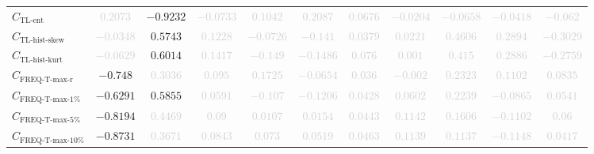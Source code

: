\documentclass{standalone}
\newcommand{\tlentropyname}{\text{TL-ent}}
\newcommand{\tlentropy}{C_{\tlentropyname}}
\newcommand{\tlskewhistname}{\text{TL-hist-skew}}
\newcommand{\tlskewhist}{C_{\tlskewhistname}}
\newcommand{\tlkurthistname}{\text{TL-hist-kurt}}
\newcommand{\tlkurthist}{C_{\tlkurthistname}}
\newcommand{\freqmaxrname}{\text{FREQ-T-max-r}}
\newcommand{\freqmaxr}{C_{\freqmaxrname}}
\newcommand{\freqmaxonename}{\text{FREQ-T-max-1\%}}
\newcommand{\freqmaxone}{C_{\freqmaxonename}}
\newcommand{\freqmaxfivename}{\text{FREQ-T-max-5\%}}
\newcommand{\freqmaxfive}{C_{\freqmaxfivename}}
\newcommand{\freqmaxtenname}{\text{FREQ-T-max-10\%}}
\newcommand{\freqmaxten}{C_{\freqmaxtenname}}
\begin{document}
\begin{tabular}{lcccccccccc}
$\tlentropy$ & \textcolor{lightgray}{$0.2073$} & $-0.9232$ & \textcolor{lightgray}{$-0.0733$} & \textcolor{lightgray}{$0.1042$} & \textcolor{lightgray}{$0.2087$} & \textcolor{lightgray}{$0.0676$} & \textcolor{lightgray}{$-0.0204$} & \textcolor{lightgray}{$-0.0658$} & \textcolor{lightgray}{$-0.0418$} & \textcolor{lightgray}{$-0.062$} \\ 
$\tlskewhist$ & \textcolor{lightgray}{$-0.0348$} & $0.5743$ & \textcolor{lightgray}{$0.1228$} & \textcolor{lightgray}{$-0.0726$} & \textcolor{lightgray}{$-0.141$} & \textcolor{lightgray}{$0.0379$} & \textcolor{lightgray}{$0.0221$} & \textcolor{lightgray}{$0.4606$} & \textcolor{lightgray}{$0.2894$} & \textcolor{lightgray}{$-0.3029$} \\ 
$\tlkurthist$ & \textcolor{lightgray}{$-0.0629$} & $0.6014$ & \textcolor{lightgray}{$0.1417$} & \textcolor{lightgray}{$-0.149$} & \textcolor{lightgray}{$-0.1486$} & \textcolor{lightgray}{$0.076$} & \textcolor{lightgray}{$0.001$} & \textcolor{lightgray}{$0.415$} & \textcolor{lightgray}{$0.2886$} & \textcolor{lightgray}{$-0.2759$} \\ 
$\freqmaxr$ & $-0.748$ & \textcolor{lightgray}{$0.3036$} & \textcolor{lightgray}{$0.095$} & \textcolor{lightgray}{$0.1725$} & \textcolor{lightgray}{$-0.0654$} & \textcolor{lightgray}{$0.036$} & \textcolor{lightgray}{$-0.002$} & \textcolor{lightgray}{$0.2323$} & \textcolor{lightgray}{$0.1102$} & \textcolor{lightgray}{$0.0835$} \\ 
$\freqmaxone$ & $-0.6291$ & $0.5855$ & \textcolor{lightgray}{$0.0591$} & \textcolor{lightgray}{$-0.107$} & \textcolor{lightgray}{$-0.1206$} & \textcolor{lightgray}{$0.0428$} & \textcolor{lightgray}{$0.0602$} & \textcolor{lightgray}{$0.2239$} & \textcolor{lightgray}{$-0.0865$} & \textcolor{lightgray}{$0.0541$} \\ 
$\freqmaxfive$ & $-0.8194$ & \textcolor{lightgray}{$0.4469$} & \textcolor{lightgray}{$0.09$} & \textcolor{lightgray}{$0.0107$} & \textcolor{lightgray}{$0.0154$} & \textcolor{lightgray}{$0.0443$} & \textcolor{lightgray}{$0.1142$} & \textcolor{lightgray}{$0.1606$} & \textcolor{lightgray}{$-0.1102$} & \textcolor{lightgray}{$0.06$} \\ 
$\freqmaxten$ & $-0.8731$ & \textcolor{lightgray}{$0.3671$} & \textcolor{lightgray}{$0.0843$} & \textcolor{lightgray}{$0.073$} & \textcolor{lightgray}{$0.0519$} & \textcolor{lightgray}{$0.0463$} & \textcolor{lightgray}{$0.1139$} & \textcolor{lightgray}{$0.1137$} & \textcolor{lightgray}{$-0.1148$} & \textcolor{lightgray}{$0.0417$} \\ 

\end{tabular}
\end{document}
